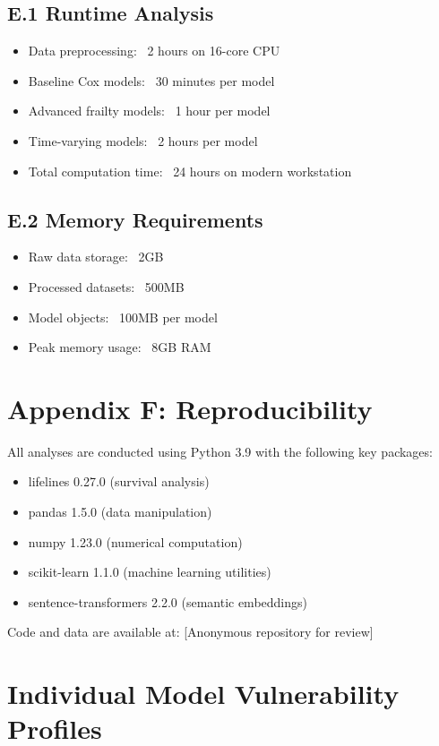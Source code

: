 \documentclass[letterpaper]{article}
\begin{document}
\subsection*{E.1 Runtime Analysis}
\begin{itemize}
\item Data preprocessing: ~2 hours on 16-core CPU
\item Baseline Cox models: ~30 minutes per model
\item Advanced frailty models: ~1 hour per model
\item Time-varying models: ~2 hours per model
\item Total computation time: ~24 hours on modern workstation
\end{itemize}

\subsection*{E.2 Memory Requirements}
\begin{itemize}
\item Raw data storage: ~2GB
\item Processed datasets: ~500MB
\item Model objects: ~100MB per model
\item Peak memory usage: ~8GB RAM
\end{itemize}

\section*{Appendix F: Reproducibility}

All analyses are conducted using Python 3.9 with the following key packages:
\begin{itemize}
\item lifelines 0.27.0 (survival analysis)
\item pandas 1.5.0 (data manipulation)
\item numpy 1.23.0 (numerical computation)
\item scikit-learn 1.1.0 (machine learning utilities)
\item sentence-transformers 2.2.0 (semantic embeddings)
\end{itemize}

Code and data are available at: [Anonymous repository for review]

\section{Individual Model Vulnerability Profiles}
\label{sec:individual_profiles}
\end{document}
